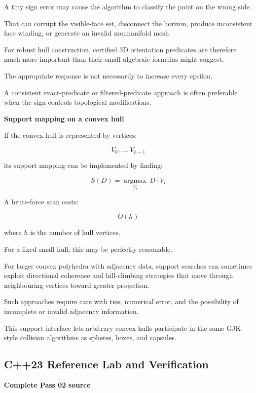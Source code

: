 A tiny sign error may cause the algorithm to classify the point on the wrong side.

That can corrupt the visible-face set, disconnect the horizon, produce inconsistent face winding, or generate an invalid nonmanifold mesh.

For robust hull construction, certified 3D orientation predicates are therefore much more important than their small algebraic formulas might suggest.

The appropriate response is not necessarily to increase every epsilon.

A consistent exact-predicate or filtered-predicate approach is often preferable when the sign controls topological modifications.

\textbf{Support mapping on a convex hull}

If the convex hull is represented by vertices:

\[
V_0,\ldots,V_{h-1}
\]

its support mapping can be implemented by finding:

\[
\boxed{ S(D)=\underset{V_i}{\operatorname{argmax}}\ D\cdot V_i }
\]

A brute-force scan costs:

\[
O(h)
\]

where \(h\) is the number of hull vertices.

For a fixed small hull, this may be perfectly reasonable.

For larger convex polyhedra with adjacency data, support searches can sometimes exploit directional coherence and hill-climbing strategies that move through neighbouring vertices toward greater projection.

Such approaches require care with ties, numerical error, and the possibility of incomplete or invalid adjacency information.

This support interface lets arbitrary convex hulls participate in the same GJK-style collision algorithms as spheres, boxes, and capsules.

\subsection{C++23 Reference Lab and Verification}\label{04-visual-computing-ii-ch022-c23-reference-lab-and-verification}

\hypertarget{04-visual-computing-ii-ch022-c23-reference-lab-and-verification}{}

\textbf{Complete Pass 02 source}

